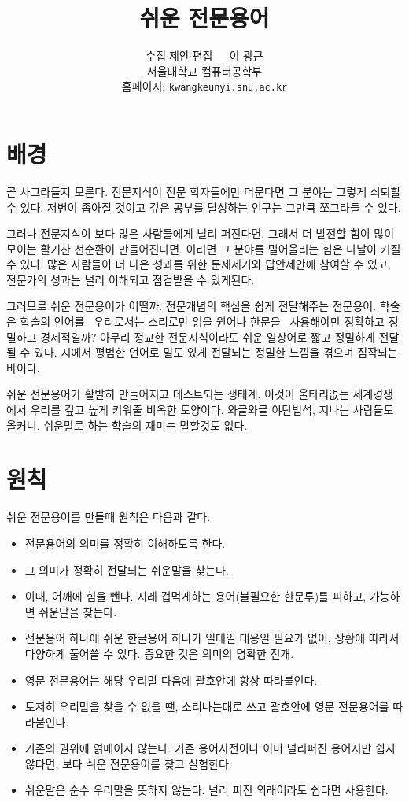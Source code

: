\documentclass[11pt]{article}
\title{쉬운 전문용어}
\author{수집\(\cdot\)제안\(\cdot\)편집\ \ \  이 광근\\
  서울대학교 컴퓨터공학부\\
  홈페이지: \texttt{kwangkeunyi.snu.ac.kr}
}
\date{}
\begin{document}
\maketitle

\section*{배경}
곧 사그라들지 모른다. 전문지식이 전문 학자들에만 머문다면 그 분야는
그렇게 쇠퇴할 수 있다. 저변이 좁아질 것이고 깊은 공부를 달성하는 인구는
그만큼 쪼그라들 수 있다. 

그러나 전문지식이 보다 많은 사람들에게 널리 퍼진다면, 그래서 더 발전할
힘이 많이 모이는 활기찬 선순환이 만들어진다면. 이러면 그 분야를
밀어올리는 힘은 나날이 커질 수 있다. 많은 사람들이 더 나은 성과를 위한
문제제기와 답안제안에 참여할 수 있고, 전문가의 성과는 널리 이해되고
점검받을 수 있게된다.

그러므로 쉬운 전문용어가 어떨까. 전문개념의 핵심을 쉽게 전달해주는
전문용어. 학술은 학술의 언어를 --우리로서는 소리로만 읽을 원어나
한문을-- 사용해야만 정확하고 정밀하고 경제적일까? 아무리 정교한
전문지식이라도 쉬운 일상어로 짧고 정밀하게 전달될 수 있다. 시에서
평범한 언어로 밀도 있게 전달되는 정밀한 느낌을 겪으며 짐작되는 바이다.

쉬운 전문용어가 활발히 만들어지고 테스트되는 생태계.
이것이 울타리없는 세계경쟁에서 우리를 깊고 높게 키워줄 비옥한
토양이다. 와글와글 야단법석, 지나는 사람들도 올커니.
쉬운말로 하는 학술의 재미는 말할것도 없다.

\section*{원칙}
쉬운 전문용어를 만들때 원칙은 다음과 같다.
\begin{itemize}
\item 전문용어의 의미를 정확히 이해하도록 한다.
\item 그 의미가 정확히 전달되는 쉬운말을 찾는다.
\item 이때, 어깨에 힘을 뺀다. 지레 겁먹게하는 용어(불필요한 한문투)를
  피하고, 가능하면 쉬운말을 찾는다.
\item 전문용어 하나에 쉬운 한글용어 하나가 일대일 대응일 필요가 없이,
  상황에 따라서 다양하게 풀어쓸 수 있다. 중요한 것은 의미의 명확한
  전개.
\item 영문 전문용어는 해당 우리말 다음에 괄호안에 항상 따라붙인다.
\item 도저히 우리말을 찾을 수 없을 땐, 소리나는대로 쓰고 괄호안에 영문
  전문용어를 따라붙인다.
\item 기존의 권위에 얽매이지 않는다. 기존 용어사전이나 이미 널리퍼진
  용어지만 쉽지않다면, 보다 쉬운 전문용어를 찾고 실험한다.
\item 쉬운말은 순수 우리말을 뜻하지 않는다. 널리 퍼진 외래어라도
  쉽다면 사용한다.
\end{itemize}



\printindex
\end{document}
